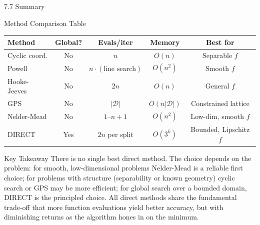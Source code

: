 \documentclass[aspectratio=169,10pt]{beamer}
\begin{document}
\begin{frame}[allowframebreaks]{7.7 Summary}
  \begin{block}{Method Comparison Table}
    \centering
    \small
    \begin{tabular}{lcccc}
      \toprule
      Method & Global? & Evals/iter & Memory & Best for \\
      \midrule
      Cyclic coord. & No & $n$ & $O(n)$ & Separable $f$ \\
      Powell        & No & $n \cdot (\text{line search})$ & $O(n^2)$ & Smooth $f$ \\
      Hooke-Jeeves  & No & $2n$ & $O(n)$ & General $f$ \\
      GPS           & No & $|\mathcal{D}|$ & $O(n|\mathcal{D}|)$ & Constrained lattice \\
      Nelder-Mead   & No & $1$--$n+1$ & $O(n^2)$ & Low-dim, smooth $f$ \\
      DIRECT        & Yes & $2n$ per split & $O(3^k)$ & Bounded, Lipschitz $f$ \\
      \bottomrule
    \end{tabular}
  \end{block}

  \begin{alertblock}{Key Takeaway}
    There is no single best direct method.  The choice depends on
    the problem: for smooth, low-dimensional problems Nelder-Mead is
    a reliable first choice; for problems with structure (separability
    or known geometry) cyclic search or GPS may be more efficient;
    for global search over a bounded domain, DIRECT is the principled
    choice.  All direct methods share the fundamental trade-off that
    more function evaluations yield better accuracy, but with
    diminishing returns as the algorithm hones in on the minimum.
  \end{alertblock}
\end{frame}
\end{document}
